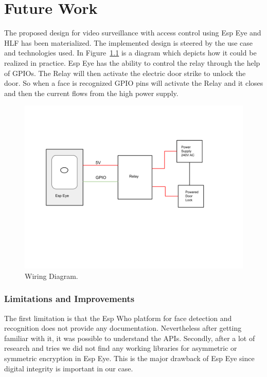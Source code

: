 \chapter{Future Work}


The proposed design for video surveillance with access control using Esp Eye and HLF has been materialized. The implemented design is steered by the use case and technologies used. 
In Figure~\ref{fig:relay} is a diagram which depicts how it could be realized in practice. Esp Eye has the ability to control the relay through the help of GPIOs. The Relay will then activate the electric door strike to unlock the door. 
So when a face is recognized GPIO pins will activate the Relay and it closes and then the current flows from the high power supply. 

\begin{figure}[!htb]
    \centering
    \includegraphics[width=1\textwidth]{figures/Relay.png}
    \caption{Wiring Diagram.}
    \label{fig:relay}
\end{figure}


\subsection{Limitations and Improvements}

The first limitation is that the Esp Who platform for face detection and recognition does not provide any documentation. Nevertheless after getting familiar with it, it was possible to understand the APIs. Secondly, after a lot of research and tries we did not find any working libraries for asymmetric or symmetric encryption in Esp Eye. This is the major drawback of Esp Eye since digital integrity is important in our case. 

